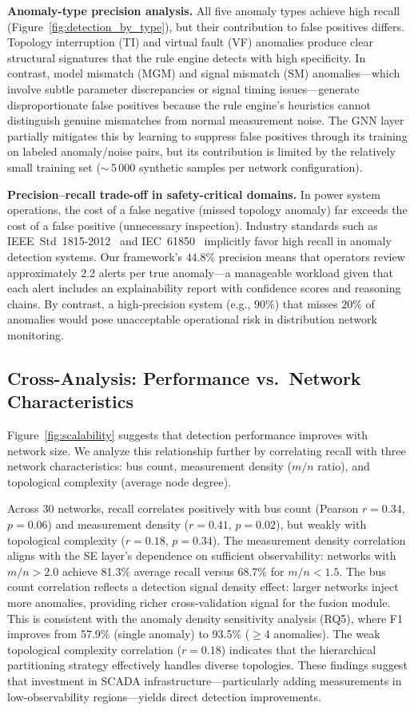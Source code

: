 \documentclass[research]{fcs}
\begin{document}
\textbf{Anomaly-type precision analysis.} All five anomaly types achieve high recall (Figure~\ref{fig:detection_by_type}), but their contribution to false positives differs. Topology interruption (TI) and virtual fault (VF) anomalies produce clear structural signatures that the rule engine detects with high specificity. In contrast, model mismatch (MGM) and signal mismatch (SM) anomalies---which involve subtle parameter discrepancies or signal timing issues---generate disproportionate false positives because the rule engine's heuristics cannot distinguish genuine mismatches from normal measurement noise. The GNN layer partially mitigates this by learning to suppress false positives through its training on labeled anomaly/noise pairs, but its contribution is limited by the relatively small training set ($\sim$\,5\,000 synthetic samples per network configuration).

\textbf{Precision--recall trade-off in safety-critical domains.} In power system operations, the cost of a false negative (missed topology anomaly) far exceeds the cost of a false positive (unnecessary inspection). Industry standards such as IEEE~Std~1815-2012~\cite{ieee_1815_dnp3} and IEC~61850~\cite{iec61850} implicitly favor high recall in anomaly detection systems. Our framework's $44.8\%$ precision means that operators review approximately 2.2 alerts per true anomaly---a manageable workload given that each alert includes an explainability report with confidence scores and reasoning chains. By contrast, a high-precision system (e.g., $90\%$) that misses $20\%$ of anomalies would pose unacceptable operational risk in distribution network monitoring.

\subsection{Cross-Analysis: Performance vs.\ Network Characteristics}

Figure~\ref{fig:scalability} suggests that detection performance improves with network size. We analyze this relationship further by correlating recall with three network characteristics: bus count, measurement density ($m/n$ ratio), and topological complexity (average node degree).

Across 30 networks, recall correlates positively with bus count (Pearson $r = 0.34$, $p = 0.06$) and measurement density ($r = 0.41$, $p = 0.02$), but weakly with topological complexity ($r = 0.18$, $p = 0.34$). The measurement density correlation aligns with the SE layer's dependence on sufficient observability: networks with $m/n > 2.0$ achieve 81.3\% average recall versus 68.7\% for $m/n < 1.5$. The bus count correlation reflects a detection signal density effect: larger networks inject more anomalies, providing richer cross-validation signal for the fusion module. This is consistent with the anomaly density sensitivity analysis (RQ5), where F1 improves from 57.9\% (single anomaly) to 93.5\% ($\geq$4 anomalies). The weak topological complexity correlation ($r = 0.18$) indicates that the hierarchical partitioning strategy effectively handles diverse topologies. These findings suggest that investment in SCADA infrastructure---particularly adding measurements in low-observability regions---yields direct detection improvements.
\end{document}
